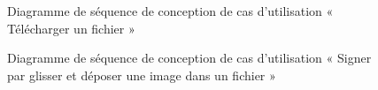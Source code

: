 \begin{figure}[H]
  \centering
  \caption{Diagramme de séquence de conception de cas d'utilisation « Télécharger un fichier »}
  \label{fig:sequence_conception_download_file}
\end{figure}

\begin{figure}[H]
  \centering
  \caption{Diagramme de séquence de conception de cas d'utilisation « Signer par glisser et déposer une image dans un fichier »}
  \label{fig:sequence_conception_sign_by_image}
\end{figure}

